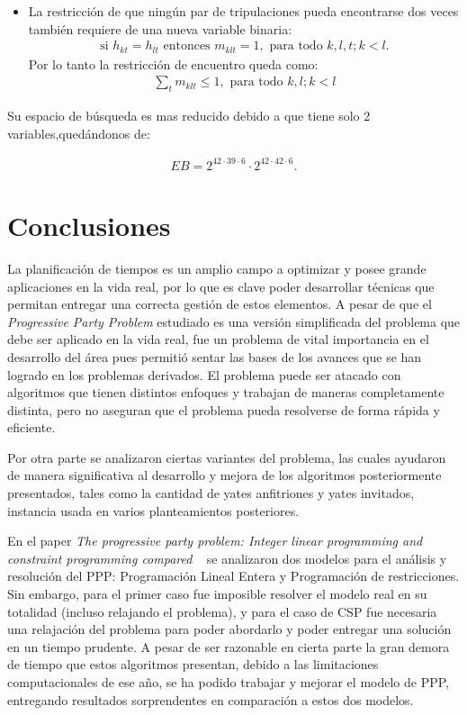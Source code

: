 \documentclass[letter, 10pt]{article}
\begin{document}
\begin{itemize}
\begin{itemize}
        \item La restricción de que ningún par de tripulaciones pueda encontrarse dos veces también requiere de una nueva variable binaria:
        \begin{align*}
            \text{si } h_{kt} = h_{lt} \text{ entonces } m_{klt} = 1, \text{ para todo } k,l,t; k<l.
        \end{align*}
        Por lo tanto la restricción de encuentro queda como:
        \begin{align*}
            \sum_{t} m_{klt} \leq 1 ,\text{ para todo } k,l;k<l
        \end{align*}
    \end{itemize}
\end{itemize}

Su espacio de búsqueda es mas reducido debido a que tiene solo 2 variables,quedándonos de:

\begin{align*}
    EB = 2^{42\cdot39\cdot6} \cdot 2^{42\cdot42\cdot6}.
\end{align*}    


\section{Conclusiones}
La planificación de tiempos es un amplio campo a optimizar y posee grande aplicaciones en la vida real, por lo que es clave poder desarrollar técnicas que permitan entregar una correcta gestión de estos elementos. A pesar de que el \textit{Progressive Party Problem} estudiado es una versión simplificada del problema que debe ser aplicado en la vida real, fue un
problema de vital importancia en el desarrollo del área pues permitió sentar las bases de los avances que se han logrado en los problemas derivados. El problema puede ser atacado con algoritmos que tienen distintos enfoques y trabajan
de maneras completamente distinta, pero no aseguran que el problema pueda resolverse de forma rápida y eficiente.

Por otra parte se analizaron ciertas variantes del problema, las cuales ayudaron de manera significativa al desarrollo y mejora de los algoritmos posteriormente presentados, tales como la cantidad de yates anfitriones y yates invitados, instancia usada en varios planteamientos posteriores.

En el paper \textit{The progressive party problem: Integer linear programming and constraint programming compared} ~\cite{Smith1996} se analizaron dos modelos para el análisis y resolución del PPP: Programación Lineal Entera y Programación de restricciones. Sin embargo, para el primer caso fue imposible resolver el modelo real en su totalidad (incluso relajando el problema), y para el caso de CSP fue necesaria una relajación del problema para poder abordarlo y poder entregar una solución en un tiempo prudente. A pesar de ser razonable en cierta parte la gran demora de tiempo que estos algoritmos presentan, debido a las limitaciones computacionales de ese año, se ha podido trabajar y mejorar el modelo de PPP, entregando resultados sorprendentes en comparación a estos dos modelos.
\end{document}
